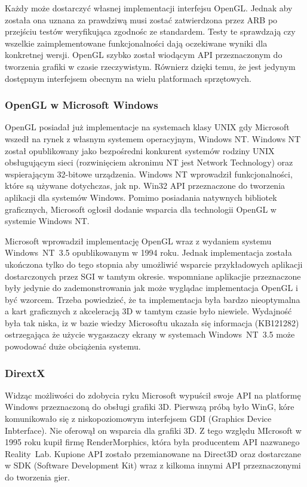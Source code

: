 Każdy może dostarczyć własnej implementacji interfejsu OpenGL. Jednak aby została ona uznana za prawdziwą musi zostać zatwierdzona przez ARB po przejściu testów weryfikująca zgodnośc ze standardem. Testy te sprawdzają czy wszelkie zaimplementowane funkcjonalności dają oczekiwane wyniki dla konkretnej wersji. OpenGL szybko został wiodącym API przeznaczonym do tworzenia grafiki w czasie rzeczywistym. Równierz dzięki temu, że jest jedynym dostępnym interfejsem obecnym na wielu platformach sprzętowych.

\subsubsection{OpenGL w Microsoft Windows}
\thispagestyle{empty}
\par\indent

OpenGL posiadał już implementacje na systemach klasy UNIX gdy Microsoft wszedł na rynek z własnym systemem operacyjnym, Windows NT. Windows NT został opublikowany jako bezpośredni konkurent systemów rodziny UNIX obsługującym sieci (rozwinięciem akronimu NT jest Network Technology) oraz wspierającym 32-bitowe urządzenia. Windows NT wprowadził funkcjonalności, które są używane dotychczas, jak np. Win32 API przeznaczone do tworzenia aplikacji dla systemów Windows. Pomimo posiadania natywnych bibliotek graficznych, Microsoft ogłosił dodanie wsparcia dla technologii OpenGL w systemie Windows NT.

Microsoft wprowadził implementację OpenGL wraz z wydaniem systemu Windows~NT~3.5 opublikowanym w 1994 roku. Jednak implementacja została ukończona tylko do tego stopnia aby umożliwić wsparcie przykładowych aplikacji dostarczonych przez SGI w tamtym okresie. wspomniane aplikacjie przeznaczone były jedynie do zademonstrowania jak może wyglądac implementacja OpenGL i być wzorcem. Trzeba powiedzieć, że ta implementacja była bardzo nieoptymalna a kart graficznych z akceleracją 3D w tamtym czasie było niewiele. Wydajność była tak niska, iz w bazie wiedzy Microsoftu ukazała się informacja (KB121282) ostrzegająca że użycie wygaszaczy ekrany w systemach Windows~NT~3.5 może powodować duże obciążenia systemu.

\subsubsection{DirextX}
\thispagestyle{empty}
\par\indent

Widząc możliwości do zdobycia ryku Microsoft wypuścił swoje API na platformę Windows przeznaczoną do obsługi grafiki 3D. Pierwszą próbą było WinG, kóre komunikowało się z niskopoziomowym interfejsem GDI (Graphics Device Inbterface). Nie oferowął on wsparcia dla grafiki 3D. Z tego względu MIcrosoft w 1995 roku kupił firmę RenderMorphics, która była producentem API nazwanego Reality~Lab. Kupione API zostało przemianowane na Direct3D oraz dostarczane w SDK (Software Development Kit) wraz z kilkoma innymi API przeznaczonymi do tworzenia gier.

